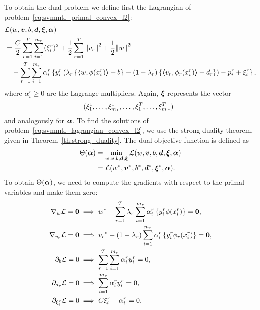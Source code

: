  To obtain the dual problem we define first the Lagrangian of problem~\eqref{eq:svmmtl_primal_convex_l2}:
\begin{equation}\label{eq:svmmtl_lagrangian_convex_l2}
    \begin{aligned}
        & \lagr({w}, \fv{v}, b, \fv{d}, \fv{\xi}, \fv{\alpha}) \\
        &=  \frac{C}{2} \sum_{r= 1}^T \sum_{i=1}^{m_r} ({\xi_{i}^r})^2 + \frac{1}{2} \sum_{r= 1}^T{\norm{{v}_r}^2} + \frac{1}{2} {\norm{{w}}}^2 \\
        &\quad -  \sum_{r= 1}^T \sum_{i=1}^{m_r} \alpha_i^r \left\lbrace y_{i}^r  \left(\lambda_r \left\lbrace \dotp{w}{\phi(x_{i}^r)} + b  \right\rbrace + (1 - \lambda_r) \left\lbrace \dotp{{v}_r}{\phi_r(x_{i}^r)} + d_r \right\rbrace  \right) - p_{i}^r + \xi_{i}^r  \right\rbrace ,
    \end{aligned}
\end{equation}
where $\alpha_i^r \geq 0$ are the Lagrange multipliers. 
Again, $\bm{\xi}$ represents the vector $$(\xi_1^1, \ldots, \xi_{m_1}^1, \ldots, \xi_1^T, \ldots, \xi_{m_T}^T)^\intercal$$ and analogously for $\bm{\alpha}$. 
To find the solutions of problem~\eqref{eq:svmmtl_lagrangian_convex_l2}, we use the strong duality theorem, given in Theorem~\ref{th:strong_duality}. The dual objective function is defined as 
\begin{equation}\nonumber
    \begin{aligned}
         \Theta(\bm{\alpha}) &=  \min_{{w}, \bm{v}, b, \bm{d}, \bm{\xi}} \mathcal{L}({w}, \bm{v}, b, \bm{d}, \bm{\xi}, \bm{\alpha}) \\
         &= \mathcal{L}({{w}}^*, {\bm{v}}^*, {b}^*, {\bm{d}}^*, {\bm{\xi}}^*, \bm{\alpha}) .
    \end{aligned}    
\end{equation}
To obtain $\Theta(\bm{\alpha})$, we need to compute the gradients with respect to the primal variables and make them zero:
\begin{align}
    \grad_{{w}} \lagr = \fv{0}  &\implies \optim{{w}} - \sum_{r= 1}^\ntasks \lambda_r \sum_{i=1}^{m_r} {\alpha_i^r} \left\lbrace y_i^r \phi(x_i^r) \right\rbrace = \fv{0} , \label{eq:common_repr_conv_l2} \\
    \grad_{{v}_r} \lagr = \fv{0} &\implies \optim{{v}_r} - (1 - \lambda_r) \sum_{i=1}^{m_r} {\alpha_i^r} \left\lbrace y_i^r \phi_r(x_i^r) \right\rbrace = \fv{0} , \label{eq:specific_repr_conv_l2} \\
    \partial_{b} \lagr = 0  &\implies \sum_{r= 1}^T \sum_{i=1}^{m_r} {\alpha_i^r} y_i^r = 0 , \label{eq:specific_eqconstr_conv_l2}  \\
    \partial_{{d}_r} \lagr = 0 &\implies \sum_{i=1}^{m_r} {\alpha_i^r} y_i^r = 0 , \label{eq:common_eqconstr_conv_l2} \\
    \partial_{\xi_i^r} \lagr = 0 &\implies C \xi_i^r - {\alpha_i^r} = 0 . \label{eq:xi_feas_conv_l2}
\end{align}
